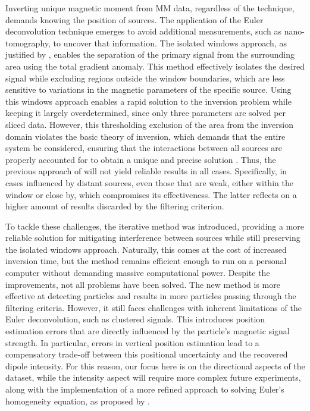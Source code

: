 Inverting unique magnetic moment from MM data, regardless of the technique, demands knowing the position of sources. The application of the Euler deconvolution technique emerges to avoid additional measurements, such as nano-tomography, to uncover that information. The isolated windows approach, as justified by \cite{Souza-Junior2024}, enables the separation of the primary signal from the surrounding area using the total gradient anomaly. This method effectively isolates the desired signal while excluding regions outside the window boundaries, which are less sensitive to variations in the magnetic parameters of the specific source. Using this windows approach enables a rapid solution to the inversion problem while keeping it largely overdetermined, since only three parameters are solved per sliced data. However, this thresholding exclusion of the area from the inversion domain violates the basic theory of inversion, which demands that the entire system be considered, ensuring that the interactions between all sources are properly accounted for to obtain a unique and precise solution \citep{Baratchart2013, Lima2013}. Thus, the previous approach of \cite{Souza-Junior2024} will not yield reliable results in all cases. Specifically, in cases influenced by distant sources, even those that are weak, either within the window or close by, which compromises its effectiveness. The latter reflects on a higher amount of results discarded by the filtering criterion. 

To tackle these challenges, the iterative method was introduced, providing a more reliable solution for mitigating interference between sources while still preserving the isolated windows approach. Naturally, this comes at the cost of increased inversion time, but the method remains efficient enough to run on a personal computer without demanding massive computational power. Despite the improvements, not all problems have been solved. The new method is more effective at detecting particles and results in more particles passing through the filtering criteria. However, it still faces challenges with inherent limitations of the Euler deconvolution, such as clustered signals. This introduces position estimation errors that are directly influenced by the particle's magnetic signal strength. In particular, errors in vertical position estimation lead to a compensatory trade-off between this positional uncertainty and the recovered dipole intensity. For this reason, our focus here is on the directional aspects of the dataset, while the intensity aspect will require more complex future experiments, along with the implementation of a more refined approach to solving Euler's homogeneity equation, as proposed by \citet{Uieda2024}.

